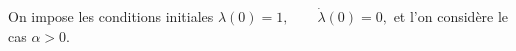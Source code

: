 %

\medskip

On impose les conditions initiales
\(
\lambda(0)=1, \qquad \dot\lambda(0)=0,
\)
et l'on considère le cas \(\alpha>0\).

\medskip

%

